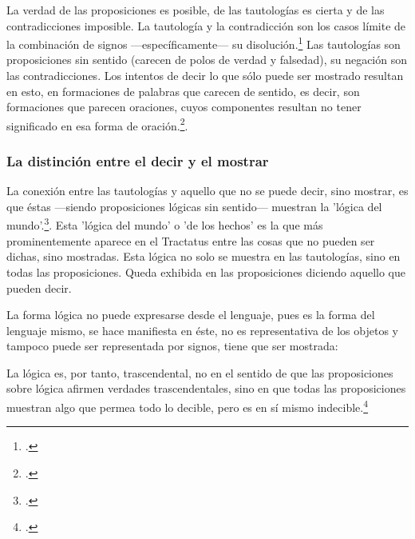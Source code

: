 
    La verdad de las proposiciones es posible, de las tautologías es cierta y de las
    contradicciones imposible. La tautología y la contradicción son los casos límite
    de la combinación de signos ---específicamente--- su
    disolución.\footcite[cf.~][4.464 y 4.466]{tractatus} Las tautologías son
    proposiciones sin sentido (carecen de polos de verdad y falsedad), su negación son
    las contradicciones. Los intentos de decir lo que sólo puede ser mostrado
    resultan en esto, en formaciones de palabras que carecen de sentido, es decir,
    son formaciones que parecen oraciones, cuyos componentes resultan no tener
    significado en esa forma de oración.\footcite[cf.~][p.~163~\S2]{IWT}.

    \subsubsection{La distinción entre el decir y el mostrar}
    La conexión entre las tautologías y aquello que no se puede decir, sino mostrar,
    es que éstas ---siendo proposiciones lógicas sin sentido--- muestran la 'lógica del
    mundo'.\footcite[cf.~][p.~163~\S3]{IWT}. Esta 'lógica del mundo' o 'de los
    hechos' es la que más prominentemente aparece en el Tractatus entre las cosas
    que no pueden ser dichas, sino mostradas. Esta lógica no solo se muestra en las
    tautologías, sino en todas las proposiciones. Queda exhibida en las proposiciones
    diciendo aquello que pueden decir. 

    La forma lógica no puede expresarse desde el lenguaje, pues es la forma del
    lenguaje mismo, se hace manifiesta en éste, no es representativa de los objetos
    y tampoco puede ser representada por signos, tiene que ser mostrada:

    La lógica es, por tanto, trascendental, no en el sentido de que las
    proposiciones sobre lógica afirmen verdades trascendentales, sino en que todas
    las proposiciones muestran algo que permea todo lo decible, pero es en sí mismo
    indecible.\footcite[cf.~][p.~166 \S2]{IWT}

